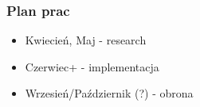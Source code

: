 \documentclass{beamer}
\begin{document}

\begin{frame}
\frametitle{Plan prac}

\begin{itemize}
\item Kwiecień, Maj - research
\item Czerwiec+ - implementacja
\item Wrzesień/Październik (?) - obrona
\end{itemize}

\end{frame}

\end{document}
